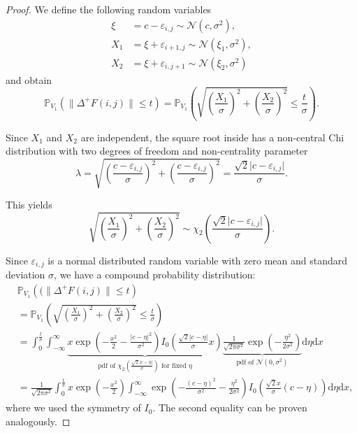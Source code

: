 \documentclass[a4paper,12pt]{article}
\newcommand{\abs}[1]{\lvert#1\rvert}
\newcommand{\norm}[1]{\lVert#1\rVert}
\theoremstyle{plain}
\theoremstyle{definition}
\begin{document}
\begin{proof}
	We define the following random variables
	\begin{align*}
		\xi &= c - \varepsilon_{i, j} \sim \mathcal{N}\left( c, \sigma^2 \right), \\
		X_1 &= \xi + \varepsilon_{i + 1, j} \sim \mathcal{N}\left( \xi_1, \sigma^2 \right), \\
		X_2 &= \xi + \varepsilon_{i, j + 1} \sim \mathcal{N}\left( \xi_2, \sigma^2 \right)
	\end{align*}
	and obtain
	\begin{equation*}
		\mathbb{P}_{V_1}\left( \norm{\Delta^+ F(i, j)} \leq t \right) = \mathbb{P}_{V_1}\left( \sqrt{\left( \frac{X_1}{\sigma} \right)^2 + \left( \frac{X_2}{\sigma} \right)^2} \leq \frac{t}{\sigma} \right).
	\end{equation*}
	
	Since $X_1$ and $X_2$ are independent, the square root inside has a non-central Chi distribution with two degrees of freedom and non-centrality parameter
	\begin{equation*}
		\lambda = \sqrt{\left( \frac{c - \varepsilon_{i, j}}{\sigma} \right)^2 + \left( \frac{c - \varepsilon_{i, j}}{\sigma} \right)^2} = \frac{\sqrt{2} \abs{c - \varepsilon_{i, j}}}{\sigma}.
	\end{equation*}
	
	This yields
	\begin{equation*}
		\sqrt{\left( \frac{X_1}{\sigma} \right)^2 + \left( \frac{X_2}{\sigma} \right)^2} \sim \chi_2 \left( \frac{\sqrt{2} \abs{c - \varepsilon_{i, j}}}{\sigma} \right).
	\end{equation*}
	
	Since $\varepsilon_{i, j}$ is a normal distributed random variable with zero mean and standard deviation $\sigma$, we have a compound probability distribution:
	\begin{align*}
		&\mathbb{P}_{V_1}\left(( \norm{\Delta^+ F(i, j)} \leq t \right) \\
		&= \mathbb{P}_{V_1}\left( \sqrt{\left( \frac{X_1}{\sigma} \right)^2 + \left( \frac{X_2}{\sigma} \right)^2} \leq \frac{t}{\sigma} \right) \\
		&= \int_0^\frac{t}{\sigma} \int_{-\infty}^\infty \underbrace{x \exp \left( - \frac{x^2}{2} - \frac{\abs{c - \eta}^2}{\sigma^2} \right) I_0 \left( \frac{\sqrt{2} \abs{c - \eta}}{\sigma} x \right)}_{\textrm{pdf of } \chi_2 \left( \frac{\sqrt{2} \abs{c - \eta}}{\sigma} \right) \textrm{ for fixed } \eta} \underbrace{\frac{1}{\sqrt{2 \pi \sigma^2}} \exp \left( - \frac{\eta^2}{2 \sigma^2} \right)}_{\textrm{pdf of } \mathcal{N}(0, \sigma^2)} \mathrm{d}\eta \mathrm{d}x \\
		&= \frac{1}{\sqrt{2 \pi \sigma^2}} \int_0^\frac{t}{\sigma} x \exp \left( - \frac{x^2}{2} \right) \int_{-\infty}^\infty \exp \left( - \frac{(c - \eta)^2}{\sigma^2} - \frac{\eta^2}{2 \sigma^2} \right) I_0 \left( \frac{\sqrt{2} x}{\sigma} (c - \eta) \right) \mathrm{d}\eta \mathrm{d}x,
	\end{align*}
	where we used the symmetry of $I_0$. The second equality can be proven analogously.
\end{proof}
\end{document}
